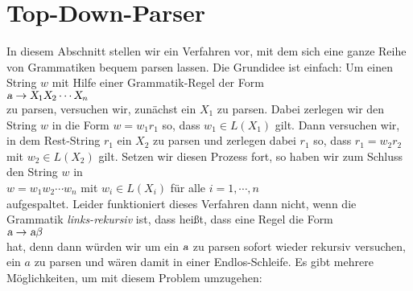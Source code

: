 \section{Top-Down-Parser}
In diesem Abschnitt stellen wir ein Verfahren vor, mit dem sich eine ganze Reihe von
Grammatiken bequem parsen lassen.  Die Grundidee ist einfach:  Um einen String $w$ mit
Hilfe einer Grammatik-Regel der Form
\\[0.2cm]
\hspace*{1.3cm}
$\textsl{a} \rightarrow \textsl{X}_1 \textsl{X}_2 \cdots \textsl{X}_n$
\\[0.2cm]
zu parsen, versuchen wir, zun\"achst ein $X_1$ zu parsen.  Dabei zerlegen wir den String $w$ in die
Form
$w = w_1 r_1$ so, dass $w_1 \in L(X_1)$ gilt.  Dann versuchen wir, in dem Rest-String
$r_1$ ein $X_2$ zu parsen und zerlegen dabei $r_1$ so, dass $r_1 = w_2 r_2$ mit 
$w_2 \in L(X_2)$ gilt.  Setzen wir diesen Prozess fort, so haben wir zum Schluss den String $w$ in
\\[0.2cm]
\hspace*{1.3cm}
$w = w_1 w_2 \cdots w_n$ \quad mit $w_i \in L(X_i)$ f\"ur alle $i=1,\cdots,n$
\\[0.2cm]
aufgespaltet.  Leider funktioniert dieses Verfahren dann nicht, wenn die Grammatik
\emph{links-rekursiv} ist, dass hei{\ss}t, dass eine Regel die Form
\\[0.2cm]
\hspace*{1.3cm}
$\textsl{a} \rightarrow \textsl{a} \beta$
\\[0.2cm]
hat, denn dann w\"urden wir um ein $\textsl{a}$ zu parsen sofort wieder rekursiv versuchen, 
ein $a$ zu parsen und w\"aren damit in einer Endlos-Schleife.  Es gibt mehrere M\"oglichkeiten, um mit
diesem Problem umzugehen:
